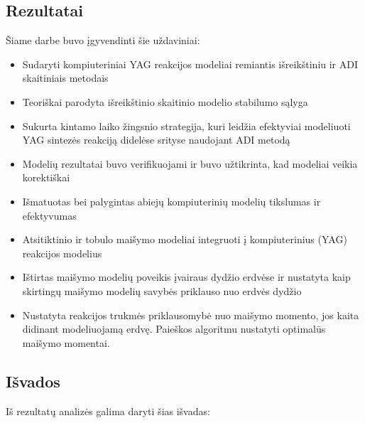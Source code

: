 
\subsection*{Rezultatai}

Šiame darbe buvo įgyvendinti šie uždaviniai:

\begin{itemize}
    \item Sudaryti kompiuteriniai YAG reakcijos modeliai remiantis išreikštiniu ir ADI skaitiniais metodais
    \item Teoriškai parodyta išreikštinio skaitinio modelio stabilumo sąlyga
    \item Sukurta kintamo laiko žingsnio strategija, kuri leidžia efektyviai modeliuoti YAG sintezės reakciją didelėse srityse naudojant ADI metodą
    \item Modelių rezultatai buvo verifikuojami ir buvo užtikrinta, kad modeliai veikia korektiškai 
    \item Išmatuotas bei palygintas abiejų kompiuterinių modelių tikslumas ir efektyvumas
    \item Atsitiktinio ir tobulo maišymo modeliai integruoti į kompiuterinius (YAG) reakcijos modelius
    \item Ištirtas maišymo modelių poveikis įvairaus dydžio erdvėse ir nustatyta kaip skirtingų maišymo modelių savybės priklauso nuo erdvės dydžio
    \item Nustatyta reakcijos trukmės priklausomybė nuo maišymo momento, jos kaita didinant modeliuojamą erdvę. Paieškos algoritmu nustatyti optimalūs maišymo momentai.
\end{itemize}

\subsection*{Išvados}

Iš rezultatų analizės galima daryti šias išvadas:

